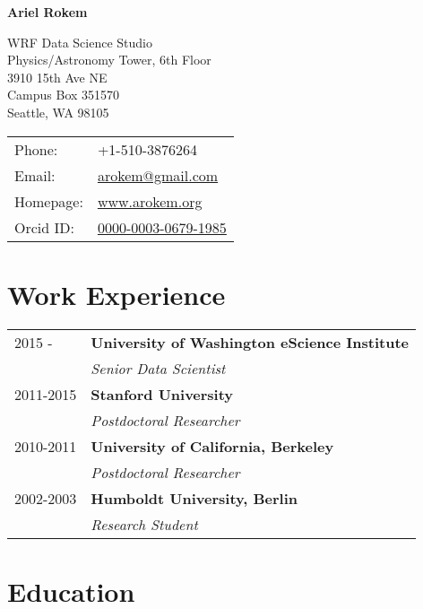 \documentclass[11pt,fullpage]{article}
\def\name{Ariel Rokem}
\begin{document}
%

\centerline{\Large \bf \name}

\vspace{0.25in}

\begin{minipage}{0.50\linewidth}
  WRF Data Science Studio\\
  Physics/Astronomy Tower, 6th Floor\\
  3910 15th Ave NE\\
  Campus Box 351570\\
  Seattle, WA 98105\\
\end{minipage}
\begin{minipage}{0.50\linewidth}
  \begin{tabular}{ll}
    Phone: & +1-510-3876264 \\
    Email: & \href{mailto:arokem@gmail.com}{arokem@gmail.com} \\
    Homepage: & \href{http://arokem.org/}{www.arokem.org} \\
    Orcid ID: & \href{http://orcid.org/0000-0003-0679-1985}{0000-0003-0679-1985} \\
  \end{tabular}
\end{minipage}

\section*{Work Experience}
\begin{tabular}{ll}
  2015 -  & {\bf University of Washington eScience Institute}\\
  & \emph{Senior Data Scientist}\\
  2011-2015 & {\bf Stanford University}\\
  & \emph{Postdoctoral Researcher}\\
  2010-2011 & {\bf University of California, Berkeley}\\
  & \emph{Postdoctoral Researcher}\\
  2002-2003 & {\bf Humboldt University, Berlin}\\
  & \emph{Research Student}\\

\end{tabular}

\section*{Education}
\end{document}
